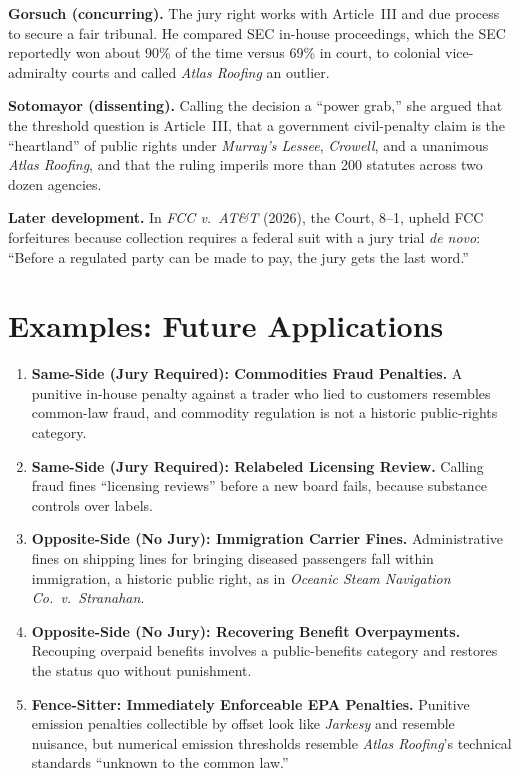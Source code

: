 \documentclass[12pt]{article}
\begin{document}
\textbf{Gorsuch (concurring).} The jury right works with Article~III and due process to secure a fair tribunal. He compared SEC in-house proceedings, which the SEC reportedly won about 90\% of the time versus 69\% in court, to colonial vice-admiralty courts and called \textit{Atlas Roofing} an outlier.

\textbf{Sotomayor (dissenting).} Calling the decision a ``power grab,'' she argued that the threshold question is Article~III, that a government civil-penalty claim is the ``heartland'' of public rights under \textit{Murray's Lessee}, \textit{Crowell}, and a unanimous \textit{Atlas Roofing}, and that the ruling imperils more than 200 statutes across two dozen agencies.

\textbf{Later development.} In \textit{FCC v.\ AT\&T} (2026), the Court, 8--1, upheld FCC forfeitures because collection requires a federal suit with a jury trial \textit{de novo}: ``Before a regulated party can be made to pay, the jury gets the last word.''

\section{Examples: Future Applications}

\begin{enumerate}
\item \textbf{Same-Side (Jury Required): Commodities Fraud Penalties.} A punitive in-house penalty against a trader who lied to customers resembles common-law fraud, and commodity regulation is not a historic public-rights category.
\item \textbf{Same-Side (Jury Required): Relabeled Licensing Review.} Calling fraud fines ``licensing reviews'' before a new board fails, because substance controls over labels.
\item \textbf{Opposite-Side (No Jury): Immigration Carrier Fines.} Administrative fines on shipping lines for bringing diseased passengers fall within immigration, a historic public right, as in \textit{Oceanic Steam Navigation Co.\ v.\ Stranahan}.
\item \textbf{Opposite-Side (No Jury): Recovering Benefit Overpayments.} Recouping overpaid benefits involves a public-benefits category and restores the status quo without punishment.
\item \textbf{Fence-Sitter: Immediately Enforceable EPA Penalties.} Punitive emission penalties collectible by offset look like \textit{Jarkesy} and resemble nuisance, but numerical emission thresholds resemble \textit{Atlas Roofing}'s technical standards ``unknown to the common law.''
\end{enumerate}
\end{document}
